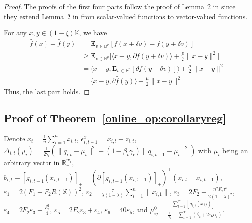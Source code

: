 \documentclass[12pt,draftcls,onecolumn]{IEEEtran}%
\begin{document}
\begin{proof}
The proofs of the first four parts follow the proof of Lemma~2 in \cite{yi2019distributed} since they extend Lemma~2 in \cite{yi2019distributed} from scalar-valued functions to vector-valued functions.

For any $x,y\in(1-\xi)\mathbb{K}$, we have
\begin{align*}
\hat{f}(x)-\hat{f}(y)&=\mathbf{E}_{v\in\mathbb{B}^p}[f(x+\delta v)-f(y+\delta v)]\\
&\ge\mathbf{E}_{v\in\mathbb{B}^p}\Big[\langle x-y,\partial f(y+\delta v)\rangle+\frac{\mu}{2}\|x-y\|^2\Big]\\
&=\langle x-y,\mathbf{E}_{v\in\mathbb{B}^p}[\partial f(y+\delta v)]\rangle+\frac{\mu}{2}\|x-y\|^2\\
&=\langle x-y,\partial \hat{f}(y)\rangle+\frac{\mu}{2}\|x-y\|^2.
\end{align*}
Thus, the last part holds.
\end{proof}

\subsection{Proof of Theorem~\ref{online_op:corollaryreg}}\label{online_op:corollaryregproof}
Denote $\bar{x}_{t}=\frac{1}{n}\sum_{i=1}^nx_{i,t}$, $\epsilon^x_{i,t-1}=x_{i,t}-z_{i,t}$, $\Delta_{i,t}(\mu_i)=\frac{1}{2\gamma_t}(\|q_{i,t}-\mu_i\|^2
-(1-\beta_t\gamma_t)\|q_{i,t-1}-\mu_i\|^2)$ with $\mu_i$ being an arbitrary vector in $\mathbb{R}_+^{m_i}$, $b_{i,t}=[g_{i,t-1}(x_{i,t-1})]_+ +(\partial [g_{i,t-1}(x_{i,t-1})]_+)^\top(x_{i,t}-x_{i,t-1})$, $\varepsilon_{1}=2(F_1+F_2R(\mathbb{X}))^2$, $\varepsilon_2=\frac{\tau}{\lambda(1-\lambda)}\sum_{i=1}^n\|x_{i,1}\|$, $\varepsilon_3=2F_2+\frac{n^2F_2\tau^2}{2(1-\lambda)^2}$, $\varepsilon_4=2F_2\varepsilon_3+\frac{F_2^2}{4}$, $\varepsilon_5=2F_2\varepsilon_3+\varepsilon_4$, $\varepsilon_6=40\varepsilon_5$,  and $\mu_{ij}^0=\frac{\sum_{t=1}^T[g_{i,t}(x_{j,t})]_+}
{\frac{1}{\gamma_1}
+\sum_{t=1}^T(\beta_{t}+2\varepsilon_6\alpha_{t})}$.
\end{document}
